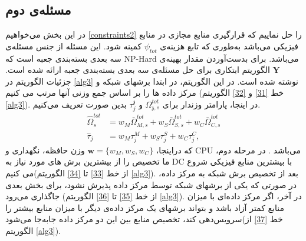 \subsection{مسئله‌ی دوم}
در این بخش می‌خواهیم \eqref{constraints2} را حل نماییم که قرارگیری منابع مجازی در منابع فیزیکی می‌باشد به‌طوری که تابع هزینه‌ی  $\psi_{tot}$ کمینه شود. این مسئله از جنس مسئله‌ی سه بعدی بسته‌بندی جعبه است که NP-Hard می‌باشد. 
برای بدست‌آوردن مقدار بهینه‌ی $\boldsymbol{Y}$ الگوریتم ابتکاری برای حل مسئله‌ی سه بعدی بسته‌بندی جعبه ارائه شده است.
جزئیات الگوریتم در \eqref{alg3} نوشته شده است. در این الگوریتم، در ابتدا برشهای شبکه و مرکز داده ها را بر اساس  جمع وزنی آنها مرتب می کنیم (خط \ref{31} و \ref{32} الگوریتم \ref{alg3}).
در اینجا، پارامتر وزندار برای $\Omega_{\mathfrak{z},s}^{tot}$ و $\tau_j^\mathfrak{z}$ بدین صورت تعریف می‌کنیم.
\begin{equation}\label{wt}
	\begin{split}
		\hat{\Omega}_{s}^{tot} &= w_M \bar{\Omega}_{M,s}^{tot} + w_S \bar{\Omega}_{S,s}^{tot} + w_C \bar{\Omega}_{C,s}^{tot} \\
		\hat{\tau}_j &= w_M \tau_{{j}}^M + w_S \tau_{{j}}^S + w_C \tau_{{j}}^C,
	\end{split}
\end{equation}
که دراینجا، $\boldsymbol{w} = \{w_M, w_S, w_C\}$ وزن حافظه، نگهداری و CPU می‌باشد
\cite{3dbin}.
در مرحله دوم، ما تخصیص را از بیشترین برش های مورد نیاز به DC با بیشترین منابع فیزیکی شروع می کنیم(از خط \ref{33} تا \ref{34} الگوریتم \ref{alg3}).
 بعد از تخصیص برش شبکه به مرکز داده، در صورتی که یکی از برشهای شبکه توسط مرکز داده پذیرش نشود، برای بخش بعدی جاگذاری می‌رود
 (از خط \ref{35} تا \ref{36} الگوریتم \ref{alg3}).
 در آخر، اگر مرکز داده‌ای با میزان منابع کمتر آزاد باشد و بتواند برشهای یک مرکز داده‌ی دیگر با میزان منابع بیشتر را سرویس‌دهی کند، 
 تخصیص منابع بین این دو مرکز داده جابه‌جا می‌شود(خط \ref{37} از الگوریتم \ref{alg3}). 
